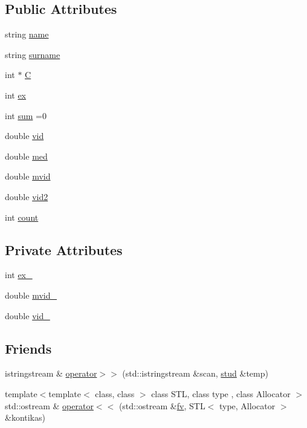 \subsection*{Public Attributes}
\begin{DoxyCompactItemize}
\item 
string \mbox{\hyperlink{structstud_a37e44f18eec7ef190da691a92701403d}{name}}
\item 
string \mbox{\hyperlink{structstud_a143c49ac194e6accadc52369f551512f}{surname}}
\item 
int $\ast$ \mbox{\hyperlink{structstud_a96d2a21c547c2ce0edd2227591a8a2b8}{C}}
\item 
int \mbox{\hyperlink{structstud_afa999423735c9497192e041f81d5988b}{ex}}
\item 
int \mbox{\hyperlink{structstud_a4deaf222b227b91e4b60acb7f0b17319}{sum}} =0
\item 
double \mbox{\hyperlink{structstud_a28f618368f8994401c1a1c7bc15f9a6f}{vid}}
\item 
double \mbox{\hyperlink{structstud_a49188ebd596d2025af68bfc7516edd17}{med}}
\item 
double \mbox{\hyperlink{structstud_a94adc86b114facb8b9ace885743d77ee}{mvid}}
\item 
double \mbox{\hyperlink{structstud_a234cd7d84de22499f5c83e4ecdac4594}{vid2}}
\item 
int \mbox{\hyperlink{structstud_a33f28b7764f314a65c5fb578e8932c13}{count}}
\end{DoxyCompactItemize}
\subsection*{Private Attributes}
\begin{DoxyCompactItemize}
\item 
int \mbox{\hyperlink{structstud_a6dc0a9d719c909a26b622e79852e5ed3}{ex\+\_\+}}
\item 
double \mbox{\hyperlink{structstud_af3578346c696017f0044103352f0e5ca}{mvid\+\_\+}}
\item 
double \mbox{\hyperlink{structstud_ae99025f9afbdc0da6db9a4375bc3beef}{vid\+\_\+}}
\end{DoxyCompactItemize}
\subsection*{Friends}
\begin{DoxyCompactItemize}
\item 
istringstream \& \mbox{\hyperlink{structstud_a73fb6f7d894b3c6bd63ce5543751ee96}{operator$>$$>$}} (std\+::istringstream \&scan, \mbox{\hyperlink{structstud}{stud}} \&temp)
\item 
{\footnotesize template$<$template$<$ class, class $>$ class S\+TL, class type , class Allocator $>$ }\\std\+::ostream \& \mbox{\hyperlink{structstud_a83c97f941e4f007dd1ba45fe029e0984}{operator$<$$<$}} (std\+::ostream \&\mbox{\hyperlink{_mutual_8h_ab476a67a3d39cadc2a4dec99c58c2762}{fv}}, S\+TL$<$ type, Allocator $>$ \&kontikas)
\end{DoxyCompactItemize}
